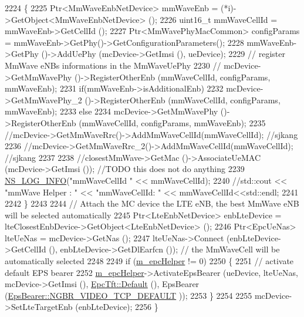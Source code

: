 \begin{DoxyCode}
2224         \{
2225                 Ptr<MmWaveEnbNetDevice> mmWaveEnb = (*i)->GetObject<MmWaveEnbNetDevice> ();
2226                 uint16\_t mmWaveCellId = mmWaveEnb->GetCellId ();
2227                 Ptr<MmWavePhyMacCommon> configParams = mmWaveEnb->GetPhy()->GetConfigurationParameters();
2228                 mmWaveEnb->GetPhy ()->AddUePhy (mcDevice->GetImsi (), ueDevice);
2229                 \textcolor{comment}{// register MmWave eNBs informations in the MmWaveUePhy}
2230         \textcolor{comment}{//      mcDevice->GetMmWavePhy ()->RegisterOtherEnb (mmWaveCellId, configParams, mmWaveEnb);}
2231                 \textcolor{keywordflow}{if}(mmWaveEnb->isAdditionalEnb)
2232                                 mcDevice->GetMmWavePhy\_2 ()->RegisterOtherEnb (mmWaveCellId, configParams, 
      mmWaveEnb);
2233                                 \textcolor{keywordflow}{else}
2234                                 mcDevice->GetMmWavePhy ()->RegisterOtherEnb (mmWaveCellId, configParams, 
      mmWaveEnb);
2235                         \textcolor{comment}{//mcDevice->GetMmWaveRrc()->AddMmWaveCellId(mmWaveCellId); //sjkang}
2236                 \textcolor{comment}{//mcDevice->GetMmWaveRrc\_2()->AddMmWaveCellId(mmWaveCellId); //sjkang}
2237 
2238                 \textcolor{comment}{//closestMmWave->GetMac ()->AssociateUeMAC (mcDevice->GetImsi ()); //TODO this does not do
       anything}
2239                 \hyperlink{group__logging_gafbd73ee2cf9f26b319f49086d8e860fb}{NS\_LOG\_INFO}(\textcolor{stringliteral}{"mmWaveCellId "} << mmWaveCellId);
2240                 \textcolor{comment}{//std::cout  << "mmWave Helper : " << "mmWaveCellId: " << mmWaveCellId<<std::endl;}
2241 
2242         \}
2243 
2244         \textcolor{comment}{// Attach the MC device the LTE eNB, the best MmWave eNB will be selected automatically}
2245         Ptr<LteEnbNetDevice> enbLteDevice = lteClosestEnbDevice->GetObject<LteEnbNetDevice> ();
2246         Ptr<EpcUeNas> lteUeNas = mcDevice->GetNas ();
2247         lteUeNas->Connect (enbLteDevice->GetCellId (), enbLteDevice->GetDlEarfcn ()); \textcolor{comment}{// the MmWaveCell
       will be automatically selected}
2248 
2249         \textcolor{keywordflow}{if} (\hyperlink{classns3_1_1MmWaveHelper_a03b33f9a2480a4cdd8ffe697ccc08e9e}{m\_epcHelper} != 0)
2250         \{
2251           \textcolor{comment}{// activate default EPS bearer}
2252           \hyperlink{classns3_1_1MmWaveHelper_a03b33f9a2480a4cdd8ffe697ccc08e9e}{m\_epcHelper}->ActivateEpsBearer (ueDevice, lteUeNas, mcDevice->GetImsi (), 
      \hyperlink{classns3_1_1EpcTft_a48c099da249ba99152c2e597c864e155}{EpcTft::Default} (), EpsBearer (\hyperlink{structns3_1_1EpsBearer_aecf0c67109c5eb4ec0b07226fff5885ea0e7232f1a6148d754be3a3d9e425d452}{EpsBearer::NGBR\_VIDEO\_TCP\_DEFAULT}
      ));
2253         \}
2254 
2255         mcDevice->SetLteTargetEnb (enbLteDevice);
2256 \}
\end{DoxyCode}


